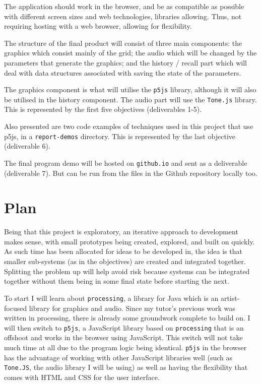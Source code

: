 The application should work in the browser, and be as compatible as possible
with different screen sizes and web technologies, libraries allowing. Thus, not
requiring hosting with a web browser, allowing for flexibility.

The structure of the final product will consist of three main components: the
graphics which consist mainly of the grid; the audio which will be changed by the
parameters that generate the graphics; and the history / recall part which will
deal with data structures associated with saving the state of the parameters.

The graphics component is what will utilise the \verb|p5js| library, although it
will also be utilised in the history component. The audio part will use the
\verb|Tone.js| library. This is represented by the first five objectives
(deliverables 1-5).

Also presented are two code examples of techniques used in this project that use
p5js, in a \verb|report-demos| directory. This is represented by the last
objective (deliverable 6).

The final program demo will be hosted on \verb|github.io| and sent as a deliverable
(deliverable 7). But can be run from the files in the Github repository locally too.

\section{Plan}
Being that this project is exploratory, an iterative approach to development
makes sense, with small prototypes being created, explored, and built on
quickly. As such time has been allocated for ideas to be developed in, the idea
is that smaller sub-systems (as in the objectives) are created and integrated
together. Splitting the problem up will help avoid risk because systems can be
integrated together without them being in some final state before starting the
next.

To start I will learn about \verb|processing|, a library for Java which is an
artist-focused library for graphics and audio. Since my tutor's previous work
was written in processing, there is already some groundwork complete to build
on. I will then switch to \verb|p5js|, a JavaScript library based on
\verb|processing| that is an offshoot and works in the browser using JavaScript.
This switch will not take much time at all due to the program logic being
identical. \verb|p5js| in the browser has the advantage of working with other
JavaScript libraries well (such as \verb|Tone.JS|, the audio library I will be
using) as well as having the flexibility that comes with HTML and CSS for the
user interface.

